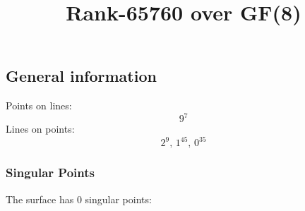 \documentclass{article}
\newcommand\setTBstruts{\def\T{\rule{0pt}{2.6ex}}%
\def\B{\rule[-1.2ex]{0pt}{0pt}}}
\begin{document}
 
\setTBstruts



{\allowdisplaybreaks%






\title{Rank-65760 over GF(8)}
\author{}%
\maketitle%
%
{}



\subsection*{General information}
Points on lines:
$$
9^7$$
Lines on points:
$$
2^9,\,1^{45},\,0^{35}$$
\subsubsection*{Singular Points}
The surface has 0 singular points:\\
\begin{align*}
\end{align*}
}
\end{document}
